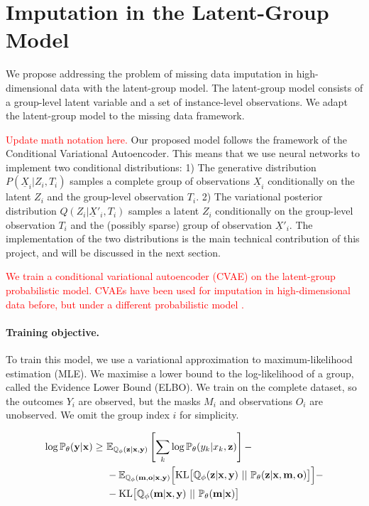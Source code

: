 \documentclass[a4paper,12pt,twoside,openright]{report}
\newcommand{\crit}[1]{\textcolor{red}{#1}}
\begin{document}
\section{Imputation in the Latent-Group Model}

We propose addressing the problem of missing data imputation in high-dimensional data with the latent-group model. The latent-group model consists of a group-level latent variable and a set of instance-level observations. We adapt the latent-group model to the missing data framework. 

\crit{Update math notation here.} Our proposed model follows the framework of the Conditional Variational Autoencoder. This means that we use neural networks to implement two conditional distributions: 1) The generative distribution $P(\underline{X}_i | Z_i, T_i)$ samples a complete group of observations $\underline{X}_i$ conditionally on the latent $Z_i$ and the group-level observation $T_i$. 2) The variational posterior distribution $Q(Z_i | \underline{X}'_i, T_i)$ samples a latent $Z_i$ conditionally on the group-level observation $T_i$ and the (possibly sparse) group of observation $\underline{X}'_i$. The implementation of the two distributions is the main technical contribution of this project, and will be discussed in the next section.

\crit{We train a conditional variational autoencoder (CVAE) on the latent-group probabilistic model. CVAEs have been used for imputation in high-dimensional data before, but under a different probabilistic model \parencite{nazabalHandlingIncompleteHeterogeneous2020, garneloConditionalNeuralProcesses2018}.}

\paragraph{Training objective.} To train this model, we use a variational approximation to maximum-likelihood estimation (MLE). We maximise a lower bound to the log-likelihood of a group, called the Evidence Lower Bound (ELBO). We train on the complete dataset, so the outcomes $Y_i$ are observed, but the masks $M_i$ and observations $O_i$ are unobserved. We omit the group index $i$ for simplicity.

\begin{align*}
    \log \mathbb{P}_\theta (\mathbf{y} | \mathbf{x}) \geq ~ & \mathbb{E}_{\mathbb{Q}_\phi (\mathbf{z} | \mathbf{x}, \mathbf{y})} \left[ \sum_k \log \mathbb{P}_\theta (y_k | x_k, \mathbf{z})\right] - \\
    & - \mathbb{E}_{\mathbb{Q}_\phi (\mathbf{m}, \mathbf{o} | \mathbf{x}, \mathbf{y})} \Bigl[ \mathrm{KL} \bigl[ \mathbb{Q}_\phi (\mathbf{z} | \mathbf{x}, \mathbf{y}) ~||~ \mathbb{P}_\theta (\mathbf{z} | \mathbf{x}, \mathbf{m}, \mathbf{o}) \bigr] \Bigr] - \\
    & - \mathrm{KL} \bigl[ \mathbb{Q}_\phi (\mathbf{m} | \mathbf{x}, \mathbf{y}) ~||~ \mathbb{P}_\theta (\mathbf{m} | \mathbf{x}) \bigr]
\end{align*}
\end{document}

